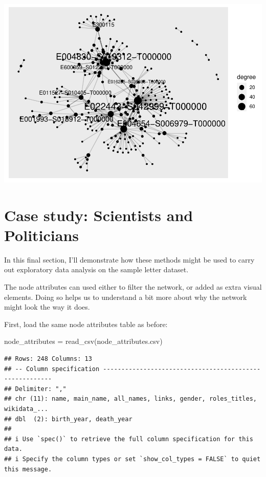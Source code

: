 \documentclass[
]{book}
\newenvironment{Shaded}{\begin{snugshade}}{\end{snugshade}}
\newcommand{\FunctionTok}[1]{\textcolor[rgb]{0.00,0.00,0.00}{#1}}
\newcommand{\NormalTok}[1]{#1}
\newcommand{\OtherTok}[1]{\textcolor[rgb]{0.56,0.35,0.01}{#1}}
\newcommand{\StringTok}[1]{\textcolor[rgb]{0.31,0.60,0.02}{#1}}
\begin{document}
\includegraphics{_main_files/figure-latex/unnamed-chunk-65-1.pdf}

\hypertarget{case-study-scientists-and-politicians}{%
\section{Case study: Scientists and Politicians}\label{case-study-scientists-and-politicians}}

In this final section, I'll demonstrate how these methods might be used to carry out exploratory data analysis on the sample letter dataset.

The node attributes can used either to filter the network, or added as extra visual elements. Doing so helps us to understand a bit more about why the network might look the way it does.

First, load the same node attributes table as before:

\begin{Shaded}
\begin{Highlighting}[]
\NormalTok{node\_attributes }\OtherTok{=} \FunctionTok{read\_csv}\NormalTok{(}\StringTok{\textquotesingle{}node\_attributes.csv\textquotesingle{}}\NormalTok{)}
\end{Highlighting}
\end{Shaded}

\begin{verbatim}
## Rows: 248 Columns: 13
## -- Column specification --------------------------------------------------------
## Delimiter: ","
## chr (11): name, main_name, all_names, links, gender, roles_titles, wikidata_...
## dbl  (2): birth_year, death_year
## 
## i Use `spec()` to retrieve the full column specification for this data.
## i Specify the column types or set `show_col_types = FALSE` to quiet this message.
\end{verbatim}
\end{document}
